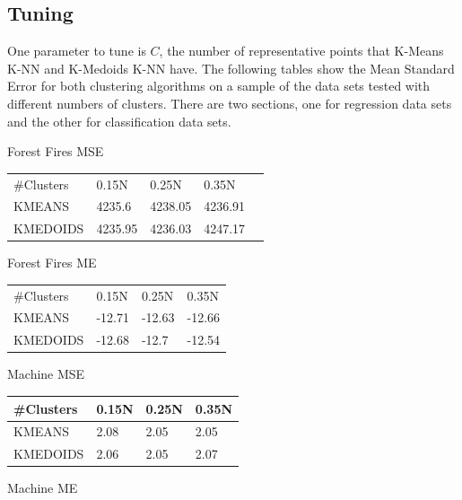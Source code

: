 \documentclass[twoside,11pt]{article}
\begin{document}
\subsection{Tuning}

One parameter to tune is $C$, the number of representative points that K-Means K-NN and K-Medoids K-NN have. The following tables show the Mean Standard Error for both clustering algorithms on a sample of the data sets tested with different numbers of clusters. There are two sections, one for regression data sets and the other for classification data sets.

\begin{table}[h]
	\begin{minipage}[b]{0.45\linewidth}\centering
		Forest Fires MSE
		\begin{tabular}{lllll}
			\cline{1-4}
			\#Clusters & 0.15N   & 0.25N   & 0.35N   &  \\ \cline{1-4}
			KMEANS     & 4235.6  & 4238.05 & 4236.91 &  \\
			KMEDOIDS   & 4235.95 & 4236.03 & 4247.17 &  \\
		\end{tabular}
	\end{minipage}
	\hspace{0.5cm}
	\begin{minipage}[b]{0.45\linewidth}
		Forest Fires ME
		\centering
		\begin{tabular}{llll}
			\cline{1-4}
			\#Clusters & 0.15N  & 0.25N  & 0.35N  \\ \cline{1-4}
			KMEANS     & -12.71 & -12.63 & -12.66 \\
			KMEDOIDS   & -12.68 & -12.7  & -12.54
		\end{tabular}
	\end{minipage}
	\begin{minipage}[b]{0.45\linewidth}\centering
		Machine MSE
		\begin{tabular}{llll}
			\hline
			\#Clusters & 0.15N & 0.25N & 0.35N \\ \hline
			KMEANS     & 2.08  & 2.05  & 2.05  \\
			KMEDOIDS   & 2.06  & 2.05  & 2.07
		\end{tabular}
	\end{minipage}
	\hspace{0.5cm}
	\begin{minipage}[b]{0.45\linewidth}
		Machine ME
		\centering

\end{minipage}
\end{table}
\end{document}
